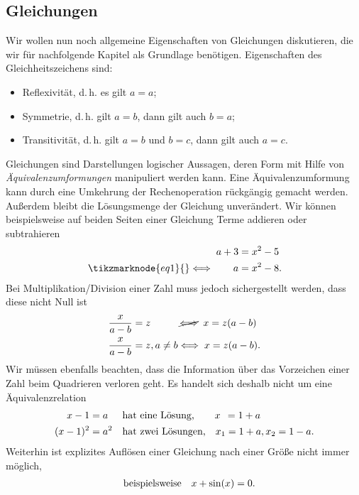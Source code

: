 \subsection{Gleichungen}
Wir wollen nun noch allgemeine Eigenschaften von Gleichungen diskutieren, die wir für nachfolgende Kapitel als Grundlage benötigen. Eigenschaften des Gleichheitszeichens sind:
\begin{itemize}
    \item Reflexivität, d.\,h. es gilt $a = a$;
    \item Symmetrie, d.\,h. gilt $a= b$, dann gilt auch $b=a$;
    \item Transitivität, d.\,h. gilt $a=b$ und $b=c$, dann gilt auch $a=c$.
\end{itemize}
Gleichungen sind Darstellungen logischer Aussagen, deren Form mit Hilfe von \emph{Äquivalenzumformungen} manipuliert werden kann. Eine Äquivalenzumformung kann durch eine Umkehrung der Rechenoperation rückgängig gemacht werden. Außerdem bleibt die Lösungsmenge der Gleichung unverändert. Wir können beispielsweise auf beiden Seiten einer Gleichung Terme addieren oder subtrahieren
\begin{align}
    a+3 &= x^2 - 5 \notag \\
    \tikzmarknode{eq1}{}\Longleftrightarrow\qquad a&= x^2 - 8.
\end{align}
Bei Multiplikation/Division einer Zahl muss jedoch sichergestellt werden, dass diese nicht Null ist \vspace{-3mm}
\begin{align}
    \begin{split}
        \frac{x}{a-b} &= z\hphantom{, a\neq b} \,\cancel{\Longleftrightarrow}\;\; x = z(a-b)\\
        \frac{x}{a-b} &= z, a\neq b \Longleftrightarrow\;  x = z(a-b).
    \end{split}
\end{align}
Wir müssen ebenfalls beachten, dass die Information über das Vorzeichen einer Zahl beim Quadrieren verloren geht. Es handelt sich deshalb nicht um eine Äquivalenzrelation 
\begin{align}
    \begin{split}
        x-1 &= a\hphantom{^2} \qq{hat eine Lösung,}\hphantom{en} x\hphantom{_1}=1+a \\
        (x-1)^2 &= a^2 \qq{hat zwei Lösungen,} x_1=1+a, x_2 =1-a.
    \end{split}
\end{align}
Weiterhin ist explizites Auflösen einer Gleichung nach einer Größe nicht immer möglich,
\begin{align}
    \qq{beispielsweise} x + \sin(x) = 0.
\end{align}